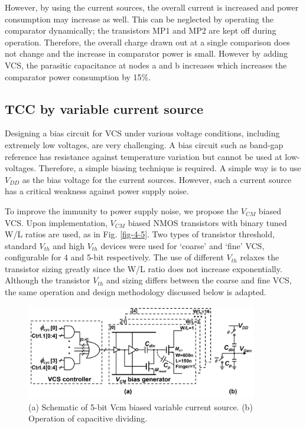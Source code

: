 However, by using the current sources, the overall current is increased and power consumption may increase as well. This can be neglected by operating the comparator dynamically; the transistors MP1 and MP2 are kept off during operation. Therefore, the overall charge drawn out at a single comparison does not change and the increase in comparator power is small. However by adding VCS, the parasitic capacitance at nodes a and b increases which increases the comparator power consumption by 15\%.

\subsection{TCC by variable current source}

Designing a bias circuit for VCS under various voltage conditions, including extremely low voltages, are very challenging. A bias circuit such as band-gap reference has resistance against temperature variation but cannot be used at low-voltages. Therefore, a simple biasing technique is required. A simple way is to use $V_{DD}$ as the bias voltage for the current sources. However, such a current source has a critical weakness against power supply noise. 

To improve the immunity to power supply noise, we propose the $V_{CM}$ biased VCS. Upon implementation, $V_{CM}$ biased NMOS transistors with binary tuned W/L ratios are used, as in Fig. \ref{fig-4-5}. Two types of transistor threshold, standard $V_{th}$ and high $V_{th}$ devices were used for ‘coarse’ and ‘fine’ VCS, configurable for 4 and 5-bit respectively. The use of different $V_{th}$ relaxes the transistor sizing greatly since the W/L ratio does not increase exponentially. Although the transistor $V_{th}$ and sizing differs between the coarse and fine VCS, the same operation and design methodology discussed below is adapted.

\begin{figure}
\centering
  \includegraphics[width=0.9\textwidth]{figure/chap4/fig6.jpg}
  \caption{(a) Schematic of 5-bit Vcm biased variable current source.
(b) Operation of capacitive dividing.}
  \label{fig-4-6}
\end{figure}

